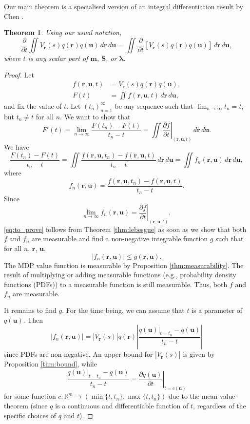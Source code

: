 \documentclass{article}
\newtheorem{theorem}{Theorem}[section]
\theoremstyle{definition}
\newcommand{\dt}{\frac{\partial}{\partial t}}
\newcommand{\f}{f(\mathbf{r}, \mathbf{u}, t)}
\newcommand{\ftn}{f(\mathbf{r}, \mathbf{u}, t_n)}
\newcommand{\fn}{f_n(\mathbf{r}, \mathbf{u})}
\newcommand{\dx}{\,d\mathbf{r}\,d\mathbf{u}}
\newcommand{\df}{\left.\frac{\partial f}{\partial t}\right|_{(\mathbf{r},
    \mathbf{u}, t)}}
\newcommand{\g}{g(\mathbf{r}, \mathbf{u})}
\begin{document}
Our main theorem is a specialised version of an integral differentiation result
by Chen \cite{lecture_notes}.
\begin{theorem}
  Using our usual notation,
  \[
    \dt\iint
    V_{\mathbf{r}}(s)q(\mathbf{r})q(\mathbf{u})\dx
    = \iint
    \dt[V_{\mathbf{r}}(s)q(\mathbf{r})q(\mathbf{u})]\dx,
  \]
  where $t$ is any scalar part of $\mathbf{m}$, $\mathbf{S}$, or $\bm\lambda$.
\end{theorem}
\begin{proof}
  Let
  \begin{align*}
    \f &= V_{\mathbf{r}}(s)q(\mathbf{r})q(\mathbf{u}), \\
    F(t) &= \iint \f\dx,
  \end{align*}
  and fix the value of $t$. Let $(t_n)_{n=1}^\infty$ be any sequence such that
  $\lim_{n \to \infty} t_n = t$, but $t_n \ne t$ for all $n$. We want to show
  that
  \begin{equation} \label{eq:to_prove}
    F'(t) = \lim_{n \to \infty} \frac{F(t_n) - F(t)}{t_n - t} = \iint \df\dx.
  \end{equation}
  We have
  \[
    \frac{F(t_n) - F(t)}{t_n - t} = \iint \frac{\ftn - \f}{t_n - t}\dx =
    \iint \fn\dx,
  \]
  where
  \[
    \fn = \frac{\ftn - \f}{t_n - t}.
  \]
  Since
  \[
    \lim_{n \to \infty} \fn = \df,
  \]
  \eqref{eq:to_prove} follows from Theorem \ref{thm:lebesgue} as soon as we show
  that both $f$ and $f_n$ are measurable and find a non-negative integrable
  function $g$ such that for all $n$, $\mathbf{r}$, $\mathbf{u}$,
  \[
    |\fn| \le \g.
  \]
  The MDP value function is measurable by Proposition \ref{thm:measurability}.
  The result of multiplying or adding measurable functions (e.g., probability
  density functions (PDFs)) to a measurable function is still measurable. Thus,
  both $f$ and $f_n$ are measurable.

  It remains to find $g$. For the time being, we can assume that $t$ is a
  parameter of $q(\mathbf{u})$. Then
  \[
    |\fn| = |V_{\mathbf{r}}(s)|q(\mathbf{r}) \left| \frac{q(\mathbf{u})|_{t =
          t_n} - q(\mathbf{u})}{t_n - t} \right|
  \]
  since PDFs are non-negative. An upper bound for
  $|V_{\mathbf{r}}(s)|$ is given by Proposition \ref{thm:bound}, while
  \[
    \frac{q(\mathbf{u})|_{t = t_n} - q(\mathbf{u})}{t_n - t} = \left.
      \frac{\partial q(\mathbf{u})}{\partial t} \right|_{t = c(\mathbf{u})}
  \]
  for some function $c : \mathbb{R}^m \to (\min\{t, t_n\}, \max\{t, t_n\})$
  due to the mean value theorem (since $q$ is a continuous and differentiable
  function of $t$, regardless of the specific choices of $q$ and $t$).


\end{proof}
\end{document}
